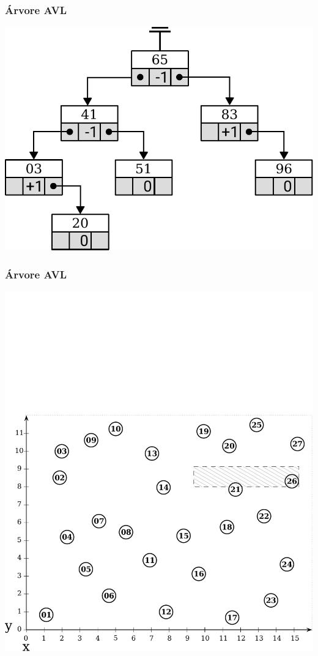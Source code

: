 \documentclass[10pt,xcolor=table,fleqn]{beamer}
\begin{document}
\begin{frame}
  \frametitle{Árvore AVL}
  \begin{center}
    \includegraphics[scale=0.3]{../img/kdt/avl-model}
  \end{center}
\end{frame}

\begin{frame}
  \frametitle{Árvore AVL}
  \begin{center}
    \includegraphics[scale=0.3]{../img/points-query/avl/points}
  \end{center}
\end{frame}
\end{document}
